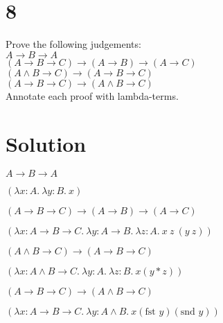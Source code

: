 \documentclass[10pt]{article}
\begin{document}
\section*{8}

Prove the following judgements:\\
$A\to B \to A$\\
$(A\to B \to C) \to (A\to B )\to (A\to C)$\\
$(A \land B \to C )\to(A\to B \to C)$\\
$(A\to B\to C)\to (A\land B \to C)$\\
Annotate each proof with lambda-terms.

\section*{Solution}

\begin{description*}
\item[] $A\to B \to A$

$(\lambda x: A.\ \lambda y: B.\ x)$


\item[] $(A\to B \to C) \to (A\to B )\to (A\to C)$

$(\lambda x: A\to B\to C.\ \lambda y: A\to B.\ \lambda z: A.\ x\ z\ (y\ z))$

\item[] $(A \land B \to C )\to(A\to B \to C)$

$(\lambda x: A\land B \to C .\ \lambda y: A.\ \lambda z: B.\ x (y*z))$

\item[] $(A\to B\to C)\to (A\land B \to C)$

$(\lambda x: A\to B\to C.\ \lambda y: A\land B.\ x(\text{fst } y)(\text{snd } y))$


\end{description*}
\end{document}
